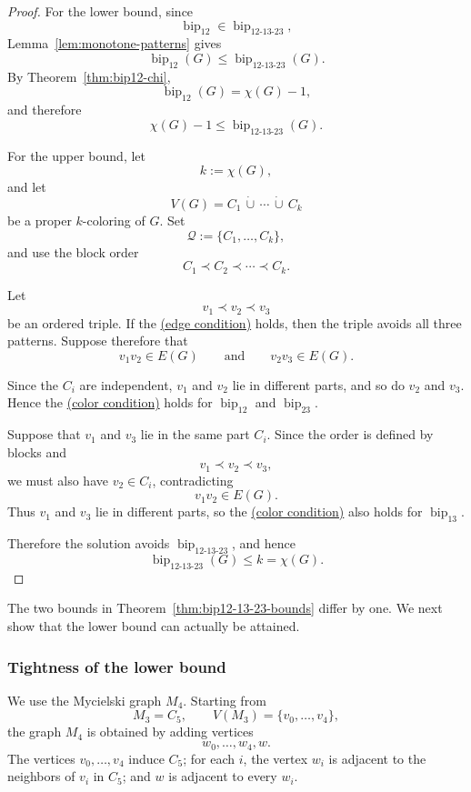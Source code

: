 \documentclass[12pt]{article}
\theoremstyle{plain}
\theoremstyle{definition}
\theoremstyle{remark}
\theoremstyle{definition}
\newcommand{\edgecondition}{%
  \hyperref[def:avoid:cond:edge]{(edge condition)}\xspace
}
\newcommand{\colorcondition}{%
  \hyperref[def:avoid:cond:color]{(color condition)}\xspace
}
\newcommand{\biplabel}{\mathrm{bip}}
\DeclareRobustCommand{\bipparam}[1]{%
  \ensuremath{\mathop{\biplabel}\nolimits_{#1}}%
}
\begin{document}
\begin{proof}
For the lower bound, since
\[
\bipparam{12}\in\bipparam{12\text{-}13\text{-}23},
\]
Lemma~\ref{lem:monotone-patterns} gives
\[
\bipparam{12}(G)
\le
\bipparam{12\text{-}13\text{-}23}(G).
\]
By Theorem~\ref{thm:bip12-chi},
\[
\bipparam{12}(G)=\chi(G)-1,
\]
and therefore
\[
\chi(G)-1
\le
\bipparam{12\text{-}13\text{-}23}(G).
\]

For the upper bound, let
\[
k:=\chi(G),
\]
and let
\[
V(G)=C_1\,\dot\cup\,\cdots\,\dot\cup\,C_k
\]
be a proper \(k\)-coloring of \(G\). Set
\[
\mathcal Q:=\{C_1,\dots,C_k\},
\]
and use the block order
\[
C_1\prec C_2\prec\cdots\prec C_k.
\]

Let
\[
v_1\prec v_2\prec v_3
\]
be an ordered triple. If the \edgecondition{} holds, then the triple avoids
all three patterns. Suppose therefore that
\[
v_1v_2\in E(G)
\qquad\text{and}\qquad
v_2v_3\in E(G).
\]

Since the \(C_i\) are independent, \(v_1\) and \(v_2\) lie in different
parts, and so do \(v_2\) and \(v_3\). Hence the \colorcondition{} holds for
\(\bipparam{12}\) and \(\bipparam{23}\).

Suppose that \(v_1\) and \(v_3\) lie in the same part \(C_i\). Since the
order is defined by blocks and
\[
v_1\prec v_2\prec v_3,
\]
we must also have \(v_2\in C_i\), contradicting
\[
v_1v_2\in E(G).
\]
Thus \(v_1\) and \(v_3\) lie in different parts, so the
\colorcondition{} also holds for \(\bipparam{13}\).

Therefore the solution avoids
\(\bipparam{12\text{-}13\text{-}23}\), and hence
\[
\bipparam{12\text{-}13\text{-}23}(G)
\le
k
=
\chi(G).
\]
\end{proof}

The two bounds in Theorem~\ref{thm:bip12-13-23-bounds} differ by one.
We next show that the lower bound can actually be attained.


\subsubsection{Tightness of the lower bound}










We use the Mycielski graph \(M_4\). Starting from
\[
M_3=C_5,
\qquad
V(M_3)=\{v_0,\dots,v_4\},
\]
the graph \(M_4\) is obtained by adding vertices
\[
w_0,\dots,w_4,w.
\]
The vertices \(v_0,\dots,v_4\) induce \(C_5\); for each \(i\), the vertex
\(w_i\) is adjacent to the neighbors of \(v_i\) in \(C_5\); and \(w\) is
adjacent to every \(w_i\).
\end{document}
